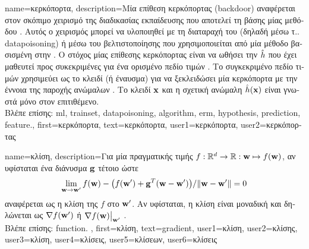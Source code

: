 {name={\foreignlanguage{greek}{κερκόπορτα}}, 
	description={\foreignlanguage{greek}{Μία επίθεση κερκόπορτας} 
		(backdoor) \foreignlanguage{greek}{αναφέρεται στον σκόπιμο χειρισμό της διαδικασίας εκπαίδευσης που αποτελεί τη βάσης 
		μίας μεθόδου} . \foreignlanguage{greek}{Αυτός ο χειρισμός μπορεί να υλοποιηθεί με τη διαταραχή του}  
		\foreignlanguage{greek}{(δηλαδή μέσω τ..} \gls{datapoisoning}) \foreignlanguage{greek}{ή μέσω του}  
		 \foreignlanguage{greek}{βελτιστοποίησης που χρησιμοποιείται από μία μέθοδο βασισμένη 
		στην} . \foreignlanguage{greek}{Ο στόχος μίας επίθεσης κερκόπορτας είναι να  
		ωθήσει την}  $\hat{h}$ \foreignlanguage{greek}{που έχει μαθευτεί
		προς συκεκριμένες}  \foreignlanguage{greek}{για ένα ορισμένο πεδίο τιμών} . 
		\foreignlanguage{greek}{Το συγκεκριμένο πεδίο τιμών}  
		\foreignlanguage{greek}{χρησιμεύει ως το κλειδί (ή έναυσμα) για να ξεκλειδώσει μία κερκόπορτα με την έννοια  
		της παροχής ανώμαλων} . \foreignlanguage{greek}{Το κλειδί ${\bf x}$ και η σχετική 
		ανώμαλη}  $\hat{h}({\bf x})$ \foreignlanguage{greek}{είναι γνωστά μόνο στον επιτιθέμενο.}\\
		\foreignlanguage{greek}{Βλέπε επίσης:} \gls{ml}, \gls{trainset}, \gls{datapoisoning}, \gls{algorithm}, \gls{erm}, \gls{hypothesis}, \gls{prediction}, \gls{feature}.},
	first={\foreignlanguage{greek}{κερκόπορτα}},
	text={\foreignlanguage{greek}{κερκόπορτα}},
	user1={\foreignlanguage{greek}{κερκόπορτα}}, %
	user2={\foreignlanguage{greek}{κερκόπορτας}} %
}

{name={\foreignlanguage{greek}{κλίση}},
	description={\foreignlanguage{greek}{Για μία} 
		 \foreignlanguage{greek}{πραγματικής τιμής 
		$f: \mathbb{R}^{d} \rightarrow \mathbb{R}: {\bf w} \mapsto f({\bf w})$, 
		αν υφίσταται ένα διάνυσμα ${\bf g}$ τέτοιο ώστε 
		$$\lim_{{\bf w} \rightarrow {\bf w}'} {f({\bf w}) - \big(f({\bf w}') + {\bf g}^{T} ({\bf w} - {\bf w}') \big) }/{\| {\bf w} - {\bf w}'\|}=0$$
		αναφέρεται ως η κλίση της $f$ στο ${\bf w}'$. Αν υφίσταται, η κλίση είναι μοναδική και δηλώνεται  
		ως $\nabla f({\bf w}')$ ή} $\nabla f({\bf w})\big|_{{\bf w}'}$ \cite{RudinBookPrinciplesMatheAnalysis}.\\
		\foreignlanguage{greek}{Βλέπε επίσης:} \gls{function}. },
	first={\foreignlanguage{greek}{κλίση}},
	text={gradient},
	user1={\foreignlanguage{greek}{κλίση}}, %
  	user2={\foreignlanguage{greek}{κλίσης}}, %
	user3={\foreignlanguage{greek}{κλίση}}, %
	user4={\foreignlanguage{greek}{κλίσεις}}, %
  	user5={\foreignlanguage{greek}{κλίσεων}}, %
	user6={\foreignlanguage{greek}{κλίσεις}} %
}

